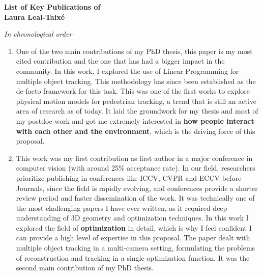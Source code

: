 \documentclass[10pt, oneside,english]{article}
\begin{document}
\begin{center}
{\huge{\bf List of Key Publications of \\ \vspace{0.1cm}
 Laura Leal-Taix{\'e}}}
\end{center}


\vspace{0.2cm}


\begin{center}
{\large{\it In chronological order}}
\end{center}

\vspace{1cm}


\begin{enumerate}


\item {}
\vspace{0.2cm}

One of the two main contributions of my PhD thesis, this paper is my most cited contribution and the one that has had a bigger impact in the community. 
In this work, I explored the use of Linear Programming for multiple object tracking. This methodology has since been established as the de-facto framework for this task. This was one of the first works to explore physical motion models for pedestrian tracking, a trend that is still an active area of research as of today. 
It laid the groundwork for my thesis and most of my postdoc work and got me extremely interested in {\bf how people interact with each other and the environment}, which is the driving force of this proposal. 

\vspace{0.6cm}


\item {}
\vspace{0.2cm}


This work was my first contribution as first author in a major conference in computer vision (with around 25\% acceptance rate). In our field, researchers prioritize publishing in conferences like ICCV, CVPR and ECCV before Journals, since the field is rapidly evolving, and conferences provide a shorter review period and faster dissemination of the work. 
It was technically one of the most challenging papers I have ever written, as it required deep understanding of 3D geometry and optimization techniques.  In this work I explored the field of {\bf optimization} in detail, which is why I feel confident I can provide a high level of expertise in this proposal. 
The paper dealt with multiple object tracking in a multi-camera setting, formulating the problems of reconstruction and tracking in a single optimization function. It was the second main contribution of my PhD thesis.


\end{enumerate}
\end{document}
